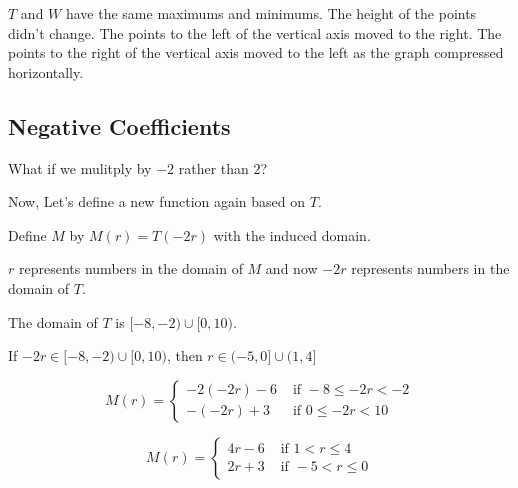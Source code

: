 \documentclass{ximera}
\begin{document}
$T$ and $W$ have the same maximums and minimums.  The height of the points didn't change.  The points to the left of the vertical axis moved to the right. The points to the right of the vertical axis moved to the left as the graph compressed horizontally.




















\subsection*{Negative Coefficients}


What if we mulitply by $-2$ rather than $2$?













Now, Let's define a new function again based on $T$.



Define $M$ by $M(r) = T(-2r)$ with the induced domain.



$r$ represents numbers in the domain of $M$ and now $-2r$ represents numbers in the domain of $T$.  

The domain of $T$ is $[-8,-2) \cup [0,10)$.


If $-2r \in [-8,-2) \cup [0,10)$, then $r \in (-5,0] \cup (1, 4]$








\[
M(r) = 
\begin{cases}
  -2(-2r)-6    & \text{ if }  -8 \leq -2r < -2 \\
  -(-2r)+3   & \text{ if } 0 \leq -2r < 10
\end{cases}
\]





\[
M(r) = 
\begin{cases}
  4r-6    & \text{ if }  1 < r \leq 4 \\
  2r + 3   & \text{ if } -5 < r \leq 0
\end{cases}
\]
\end{document}
